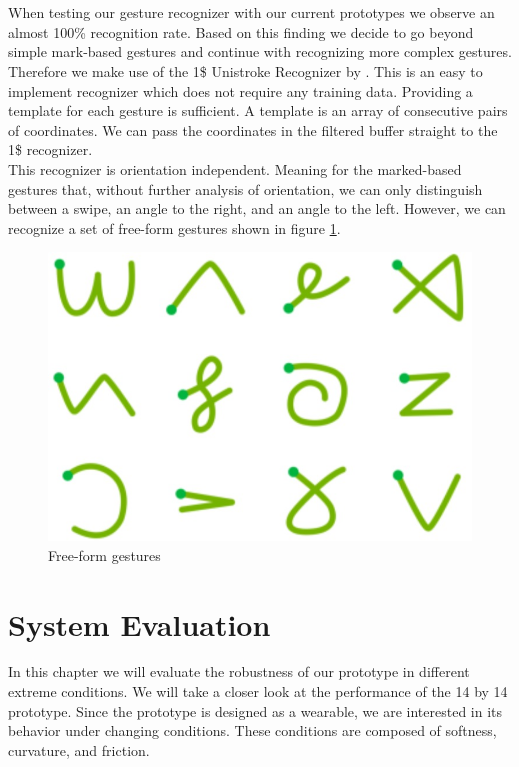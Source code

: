 \\ \\
When testing our gesture recognizer with our current prototypes we observe an almost 100\% recognition rate. Based on this finding we decide to go beyond simple mark-based gestures and continue with recognizing  more complex gestures. Therefore we make use of the 1\$ Unistroke Recognizer by \cite{Wobbrock}. This is an easy to implement recognizer which does not require any training data. Providing a template for each gesture is sufficient. A template is an array of consecutive pairs of coordinates. We can pass the coordinates in the filtered buffer straight to the 1\$ recognizer.
\\
This recognizer is orientation independent. Meaning for the marked-based gestures that, without further analysis of orientation, we can only distinguish between a swipe, an angle to the right, and an angle  to the left. However, we can recognize a set of free-form gestures shown in figure \ref{fig:freeFormGestures}.
\begin{figure}
\includegraphics[scale=0.3]{images/freeFormGestures.jpg}
\caption{Free-form gestures \cite{Bragdon}}
\label{fig:freeFormGestures}
\end{figure}


\chapter{System Evaluation}
\label{evaluation}
In this chapter we will evaluate the robustness of our prototype in different extreme conditions. We will take a closer look at the performance of the 14 by 14 prototype. Since the prototype is designed as a wearable, we are interested in its behavior under changing conditions. These conditions are composed of softness, curvature, and friction.

